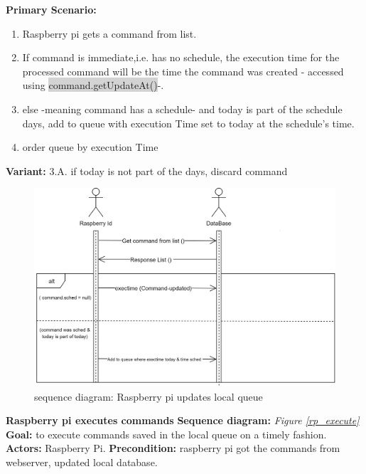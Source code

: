 \documentclass[12pt, oneside, a4paper]{book}
\newcommand{\code}[1]{{\color{red}\colorbox{lightgray}{#1}}}
\newcommand\boldcolor[1]{\textcolor{bold}{\textbf{#1}}}
\begin{document}
				\newline\textbf{Primary Scenario:}	
				\begin{enumerate}[label*=\arabic*.]
					\item Raspberry pi gets a command from list.
					\item If command is immediate,i.e. has no schedule, the execution time for the processed command will be the time the command was created - accessed using  \code{command.getUpdateAt()}-.
					\item else -meaning command has a schedule- and today is part of the schedule days, add to queue with execution Time set to today at the schedule's time.
					\item order queue by execution Time
				\end{enumerate}
				\textbf{Variant:}\newline
				\hspace*{5mm}3.A. if today is not part of the days, discard command \\
				\begin{figure}[H]
					\includegraphics[width=\linewidth]{img/sequence_queue.png}
					\caption{sequence diagram: Raspberry pi updates local queue}					\label{rp_queue}
				\end{figure}
				\newpage\hspace*{-6mm}\boldcolor{Raspberry pi executes commands}
				\newline\textbf{Sequence diagram:} \textit{Figure \ref{rp_execute}}
				\newline\textbf{Goal:} to execute commands saved in the local queue on a timely fashion.
				\newline\textbf{Actors:} Raspberry Pi.	
				\newline\textbf{Precondition:} raspberry pi got the commands from webserver, updated local database.
\end{document}
